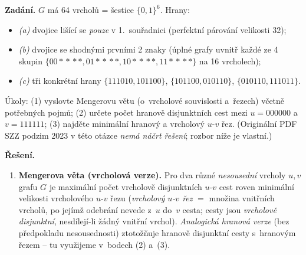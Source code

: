 \documentclass[11pt,a4paper]{article}
\begin{document}
\begin{priklad} \par
\textbf{Zadání.}
$G$ má 64 vrcholů = šestice $\{0,1\}^6$. Hrany:
\begin{itemize}
  \item \emph{(a)} dvojice lišící se \emph{pouze} v 1.\ souřadnici (perfektní párování velikosti 32);
  \item \emph{(b)} dvojice se shodnými prvními 2 znaky (úplné grafy uvnitř každé ze 4 skupin $\{00\!*\!*\!*\!*, 01\!*\!*\!*\!*, 10\!*\!*\!*\!*, 11\!*\!*\!*\!*\}$ na 16 vrcholech);
  \item \emph{(c)} tři konkrétní hrany $\{111010,101100\}$, $\{101100,010110\}$, $\{010110,111011\}$.
\end{itemize}
Úkoly: (1) vyslovte Mengerovu větu (o~vrcholové souvislosti a~řezech) včetně potřebných pojmů; (2) určete počet hranově disjunktních cest mezi $u=000000$ a $v=111111$; (3) najděte minimální hranový a vrcholový $u$-$v$ řez. (Originální PDF SZZ podzim 2023 v této otázce \emph{nemá náčrt řešení}; rozbor níže je vlastní.)

\textbf{Řešení.}
\begin{enumerate}[label=(\arabic*)]
  \item \textbf{Mengerova věta (vrcholová verze).} Pro dva různé \emph{nesousední} vrcholy $u,v$ grafu $G$ je maximální počet vrcholově disjunktních $u$-$v$ cest roven minimální velikosti vrcholového $u$-$v$ řezu (\emph{vrcholový $u$-$v$ řez} $=$ množina vnitřních vrcholů, po jejímž odebrání nevede z~$u$ do~$v$ cesta; cesty jsou \emph{vrcholově disjunktní}, nesdílejí-li žádný vnitřní vrchol). \emph{Analogická hranová verze} (bez předpokladu nesousednosti) ztotožňuje hranově disjunktní cesty s~hranovým řezem -- tu využijeme v~bodech (2) a~(3).


\end{enumerate}
\end{priklad}
\end{document}

